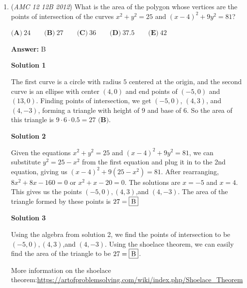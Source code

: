 \begin{enumerate}
 



\textbf{Solution 3}

Clea covers $\dfrac{1}{60}$ of the escalator every second. Say the escalator covers $\dfrac{1}{r}$ of the escalator every second. Since Clea and the escalator cover the entire escalator in $24$ seconds, we can use distance $=$ rate $\cdot$ time to get $24\left(\dfrac{1}{60} + \dfrac{1}{r}\right) = 1$. Solving gives us $r = 40$, so if Clea were to just stand on the escalator, it would take her $\boxed{\textbf{(B)}\ 40}$ seconds to get down. ~Extremelysupercooldude

 


	\item (\textit{AMC 12 12B 2012}) What is the area of the polygon whose vertices are the points of intersection of the curves $x^2 + y^2 =25$ and $(x-4)^2 + 9y^2 = 81$?


 $\textbf{(A)}\ 24\qquad\textbf{(B)}\ 27\qquad\textbf{(C)}\ 36\qquad\textbf{(D)}\ 37.5\qquad\textbf{(E)}\ 42$

 \textbf{Answer: }B



\textbf{Solution 1}

The first curve is a circle with radius $5$ centered at the origin, and the second curve is an ellipse with center $(4,0)$ and end points of $(-5,0)$ and $(13,0)$. Finding points of intersection, we get $(-5,0)$, $(4,3)$, and $(4,-3)$, forming a triangle with height of $9$ and base of $6.$ So the area of this triangle is $9 \cdot 6 \cdot 0.5 =\boxed{27 \textbf{ (B)}}.$




\textbf{Solution 2}

Given the equations $x^2 + y^2 =25$ and $(x-4)^2 + 9y^2 = 81$, we can substitute $y^2=25-x^2$ from the first equation and plug it in to the 2nd equation, giving us $(x-4)^2+9(25-x^2)=81$. After rearranging, $8x^2+8x-160=0$ or $x^2+x-20=0$. The solutions are $x=-5$ and $x=4$. This gives us the points $(-5,0),(4,3)$,and $(4,-3)$. The area of the triangle formed by these points is $27=\fbox{B}$




\textbf{Solution 3}

Using the algebra from solution 2, we find the points of intersection to be $(-5,0),(4,3)$,and $(4,-3)$. Using the shoelace theorem, we can easily find the area of the triangle to be $27=\fbox{B}$.

 More information on the shoelace theorem:\href{https://artofproblemsolving.com/wiki/index.php/Shoelace\_Theorem}{https://artofproblemsolving.com/wiki/index.php/Shoelace\_Theorem}


\end{enumerate}

